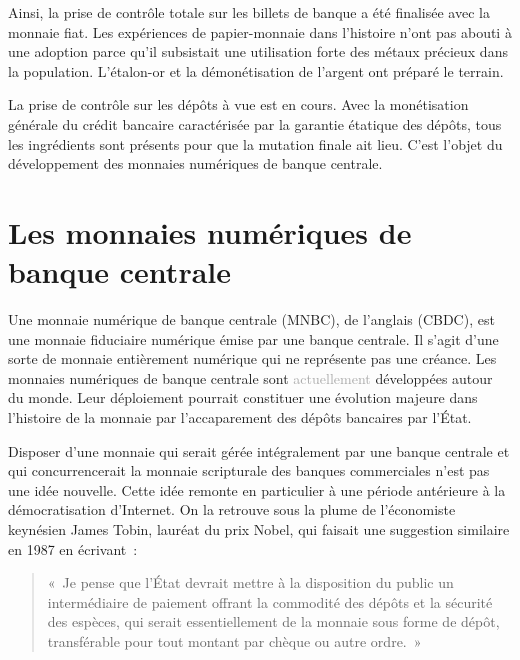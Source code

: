 

Ainsi, la prise de contrôle totale sur les billets de banque a été finalisée avec la monnaie fiat. Les expériences de papier-monnaie dans l'histoire n'ont pas abouti à une adoption parce qu'il subsistait une utilisation forte des métaux précieux dans la population. L'étalon-or et la démonétisation de l'argent ont préparé le terrain.

La prise de contrôle sur les dépôts à vue est en cours. Avec la monétisation générale du crédit bancaire caractérisée par la garantie étatique des dépôts, tous les ingrédients sont présents pour que la mutation finale ait lieu. C'est l'objet du développement des monnaies numériques de banque centrale.

\section*{Les monnaies numériques de banque centrale}

Une monnaie numérique de banque centrale (MNBC), de l'anglais  (CBDC), est une monnaie fiduciaire numérique émise par une banque centrale. Il s'agit d'une sorte de monnaie entièrement numérique qui ne représente pas une créance. Les monnaies numériques de banque centrale sont \textcolor{darkgray}{actuellement} développées autour du monde. Leur déploiement pourrait constituer une évolution majeure dans l'histoire de la monnaie par l'accaparement des dépôts bancaires par l'État.


Disposer d'une monnaie qui serait gérée intégralement par une banque centrale et qui concurrencerait la monnaie scripturale des banques commerciales n'est pas une idée nouvelle. Cette idée remonte en particulier à une période antérieure à la démocratisation d'Internet. On la retrouve sous la plume de l'économiste keynésien James Tobin, lauréat du prix Nobel, qui faisait une suggestion similaire en 1987 en écrivant~:

\begin{quote}
«~Je pense que l'État devrait mettre à la disposition du public un intermédiaire de paiement offrant la commodité des dépôts et la sécurité des espèces, qui serait essentiellement de la monnaie sous forme de dépôt, transférable pour tout montant par chèque ou autre ordre.~»
\end{quote} %

